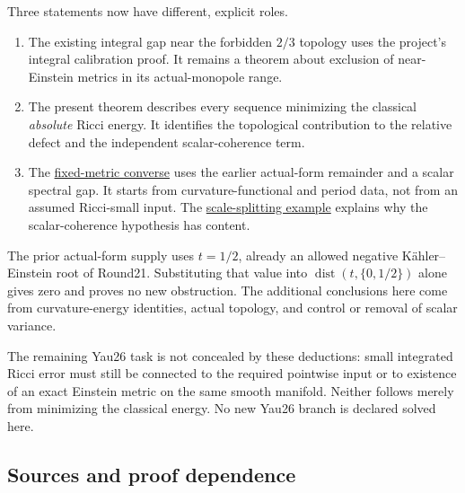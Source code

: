 \documentclass[
  11pt,
]{article}
\providecommand{\tightlist}{%
  \setlength{\itemsep}{0pt}\setlength{\parskip}{0pt}}
\begin{document}
Three statements now have different, explicit roles.

\begin{enumerate}
\def\labelenumi{\arabic{enumi}.}
\tightlist
\item
  The existing integral gap near the forbidden \(2/3\) topology uses the
  project's integral calibration proof. It remains a theorem about
  exclusion of near-Einstein metrics in its actual-monopole range.
\item
  The present theorem describes every sequence minimizing the classical
  \emph{absolute} Ricci energy. It identifies the topological
  contribution to the relative defect and the independent
  scalar-coherence term.
\item
  The \href{line1_non_kahler_bridge.md}{fixed-metric converse} uses the
  earlier actual-form remainder and a scalar spectral gap. It starts
  from curvature-functional and period data, not from an assumed
  Ricci-small input. The \href{line1_conformal_neck.md}{scale-splitting
  example} explains why the scalar-coherence hypothesis has content.
\end{enumerate}

The prior actual-form supply uses \(t=1/2\), already an allowed negative
Kähler--Einstein root of Round21. Substituting that value into
\(\operatorname{dist}(t,\{0,1/2\})\) alone gives zero and proves no new
obstruction. The additional conclusions here come from curvature-energy
identities, actual topology, and control or removal of scalar variance.

The remaining Yau26 task is not concealed by these deductions: small
integrated Ricci error must still be connected to the required pointwise
input or to existence of an exact Einstein metric on the same smooth
manifold. Neither follows merely from minimizing the classical energy.
No new Yau26 branch is declared solved here.

\hypertarget{sources-and-proof-dependence}{%
\subsection{Sources and proof
dependence}\label{sources-and-proof-dependence}}
\end{document}
